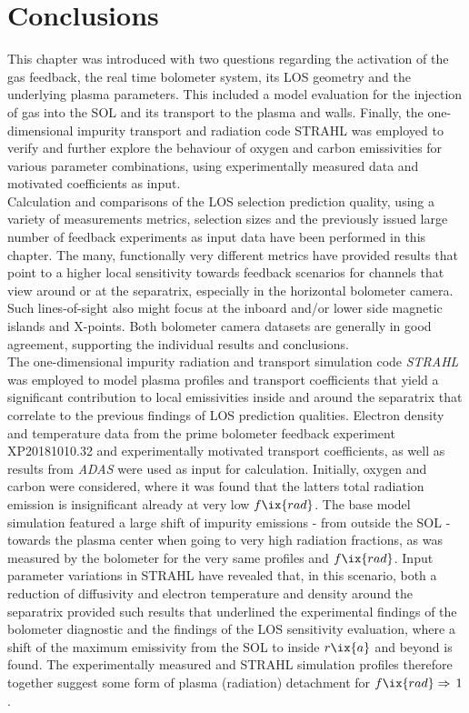     \section{Conclusions}\label{sec:conclusionschap3}%
%
        This chapter was introduced with two questions regarding the activation of the gas feedback, the real time bolometer system, its LOS geometry and the underlying plasma parameters. This included a model evaluation for the injection of gas into the SOL and its transport to the plasma and walls. Finally, the one-dimensional impurity transport and radiation code STRAHL was employed to verify and further explore the behaviour of oxygen and carbon emissivities for various parameter combinations, using experimentally measured data and motivated coefficients as input.\\%
        Calculation and comparisons of the LOS selection prediction quality, using a variety of measurements metrics, selection sizes and the previously issued large number of feedback experiments as input data have been performed in this chapter. The many, functionally very different metrics have provided results that point to a higher local sensitivity towards feedback scenarios for channels that view around or at the separatrix, especially in the horizontal bolometer camera. Such lines-of-sight also might focus at the inboard and/or lower side magnetic islands and X-points. Both bolometer camera datasets are generally in good agreement, supporting the individual results and conclusions.\\%
        The one-dimensional impurity radiation and transport simulation code \textit{STRAHL} was employed to model plasma profiles and transport coefficients that yield a significant contribution to local emissivities inside and around the separatrix that correlate to the previous findings of LOS prediction qualities. Electron density and temperature data from the prime bolometer feedback experiment XP20181010.32 and experimentally motivated transport coefficients, as well as results from \textit{ADAS} were used as input for calculation. Initially, oxygen and carbon were considered, where it was found that the latters total radiation emission is insignificant already at very low $f\ix{rad}$. The base model simulation featured a large shift of impurity emissions - from outside the SOL - towards the plasma center when going to very high radiation fractions, as was measured by the bolometer for the very same profiles and $f\ix{rad}$. Input parameter variations in STRAHL have revealed that, in this scenario, both a reduction of diffusivity and electron temperature and density around the separatrix provided such results that underlined the experimental findings of the bolometer diagnostic and the findings of the LOS sensitivity evaluation, where a shift of the maximum emissivity from the SOL to inside $r\ix{a}$ and beyond is found. The experimentally measured and STRAHL simulation profiles therefore together suggest some form of plasma (radiation) detachment for $f\ix{rad}\Rightarrow\,1$.\\%
